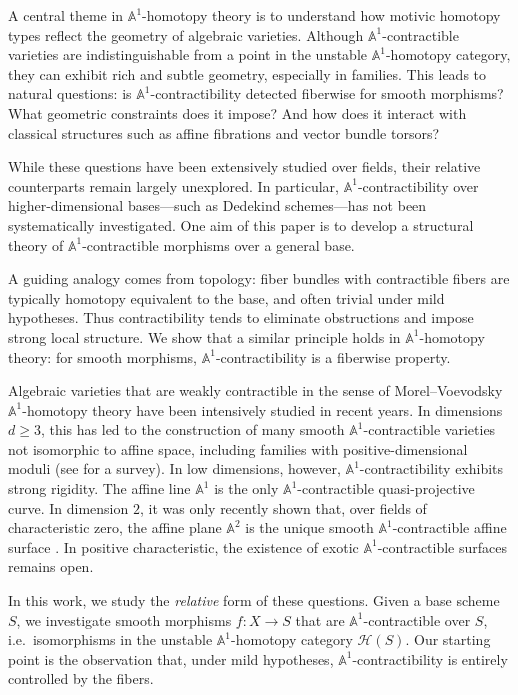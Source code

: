 \documentclass[10pt]{amsart}
\renewcommand{\AA}{\mathbb{A}}
\numberwithin{equation}{section} %
\theoremstyle{plain}
\theoremstyle{definition}
\theoremstyle{remark}
\begin{document}
 
A central theme in $\AA^1$-homotopy theory is to understand how motivic homotopy types reflect the geometry of algebraic varieties. Although $\AA^1$-contractible varieties are indistinguishable from a point in the unstable $\AA^1$-homotopy category, they can exhibit rich and subtle geometry, especially in families. This leads to natural questions: is $\AA^1$-contractibility detected fiberwise for smooth morphisms? What geometric constraints does it impose? And how does it interact with classical structures such as affine fibrations and vector bundle torsors?
\medskip

While these questions have been extensively studied over fields, their relative counterparts remain largely unexplored. In particular, $\AA^1$-contractibility over higher-dimensional bases—such as Dedekind schemes—has not been systematically investigated. One aim of this paper is to develop a structural theory of $\AA^1$-contractible morphisms over a general base.
\medskip

A guiding analogy comes from topology: fiber bundles with contractible fibers are typically homotopy equivalent to the base, and often trivial under mild hypotheses. Thus contractibility tends to eliminate obstructions and impose strong local structure. We show that a similar principle holds in $\AA^1$-homotopy theory: for smooth morphisms, $\AA^1$-contractibility is a fiberwise property.
\medskip

Algebraic varieties that are weakly contractible in the sense of Morel--Voevodsky $\AA^1$-homotopy theory have been intensively studied in recent years. In dimensions $d \geq 3$, this has led to the construction of many smooth $\AA^1$-contractible varieties not isomorphic to affine space, including families with positive-dimensional moduli (see \cite{asok2021A1} for a survey). 
In low dimensions, however, $\AA^1$-contractibility exhibits strong rigidity. The affine line $\AA^1$ is the only $\AA^1$-contractible quasi-projective curve. In dimension $2$, it was only recently shown that, over fields of characteristic zero, the affine plane $\AA^2$ is the unique smooth $\AA^1$-contractible affine surface \cite{choudhury2024}. In positive characteristic, the existence of exotic $\AA^1$-contractible surfaces remains open.
\medskip

In this work, we study the \emph{relative} form of these questions. Given a base scheme $S$, we investigate smooth morphisms $f \colon X \to S$ that are $\AA^1$-contractible over $S$, i.e.\ isomorphisms in the unstable $\AA^1$-homotopy category $\mathcal{H}(S)$. Our starting point is the observation that, under mild hypotheses, $\AA^1$-contractibility is entirely controlled by the fibers.
\end{document}
